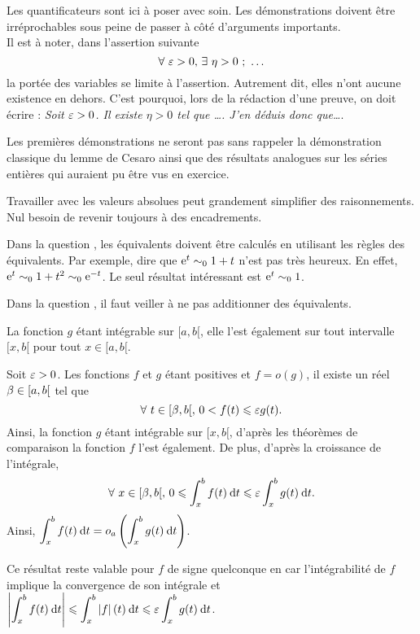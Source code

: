 \documentclass[oneside,11pt]{book}
\begin{document}
\begin{solution*}



\setcounter{cqu}{0}
\qu Les quantificateurs sont ici à poser avec soin. Les démonstrations doivent être irréprochables sous peine de passer à côté d'arguments importants.\\
Il est à noter, dans l'assertion suivante
\[
\forall~ \varepsilon > 0,\, \exists~ \eta > 0 ~;~ \ldots
\]
la portée des variables se limite à l'assertion. Autrement dit, elles n'ont aucune existence en dehors. C'est pourquoi, lors de la rédaction d'une preuve, on doit écrire : {\it Soit $\varepsilon > 0$. Il existe $\eta > 0$ tel que \ldots. J'en déduis donc que\ldots}.

\qu Les premières démonstrations ne seront pas sans rappeler la démonstration classique du lemme de Cesaro ainsi que des résultats analogues sur les séries entières qui auraient pu être vus en exercice.

\qu Travailler avec les valeurs absolues peut grandement simplifier des raisonnements. Nul besoin de revenir toujours à des encadrements.

\qu Dans la question , les équivalents doivent être calculés en utilisant les règles des équivalents. Par exemple, dire que $\operatorname{e}^t \sim_0 1 + t$ n'est pas très heureux. En effet, $\operatorname{e}^t \sim_0 1 + t^2 \sim_0 \operatorname{e}^{-t}$. Le seul résultat intéressant est $\operatorname{e}^t \sim_0 1$.

\qu Dans la question , il faut veiller à ne pas additionner des équivalents.

\setcounter{cqu}{0}

\qu La fonction $g$ étant intégrable sur $[a, b[$, elle l'est également sur tout intervalle $[x, b[$ pour tout $x \in [a, b[$.

\squ Soit $\varepsilon > 0$. Les fonctions $f$ et $g$ étant positives et $f = o(g)$, il existe un réel $\beta \in [a, b[$ tel que
\[
\forall~ t \in [\beta, b[,\, 0 < f(t) \leqslant \varepsilon g(t).
\]
Ainsi, la fonction $g$ étant intégrable sur $[x, b[$, d'après les théorèmes de comparaison la fonction $f$ l'est également. De plus, d'après la croissance de l'intégrale,
\[
\forall~ x \in [\beta, b[,\, 0 \leqslant \displaystyle \int_x^b f(t) \:{\text d}t \leqslant \varepsilon \displaystyle \int_x^b g(t) \:{\text d}t.
\]
Ainsi, $\displaystyle \int_x^b f(t) \:{\text d}t = o_{a}\left(\displaystyle \int_x^b g(t) \:{\text d}t\right)$.

 Ce résultat reste valable pour $f$ de signe quelconque en car l'intégrabilité de $f$ implique la convergence de son intégrale et $\left\lvert\displaystyle \int_x^b f(t) \:{\text d}t\right\rvert \leqslant \displaystyle \int_x^b \left\lvert f\right\rvert(t) \:{\text d}t \leqslant \varepsilon \displaystyle \int_x^b g(t) \:{\text d}t$.


\end{solution*}
\end{document}
